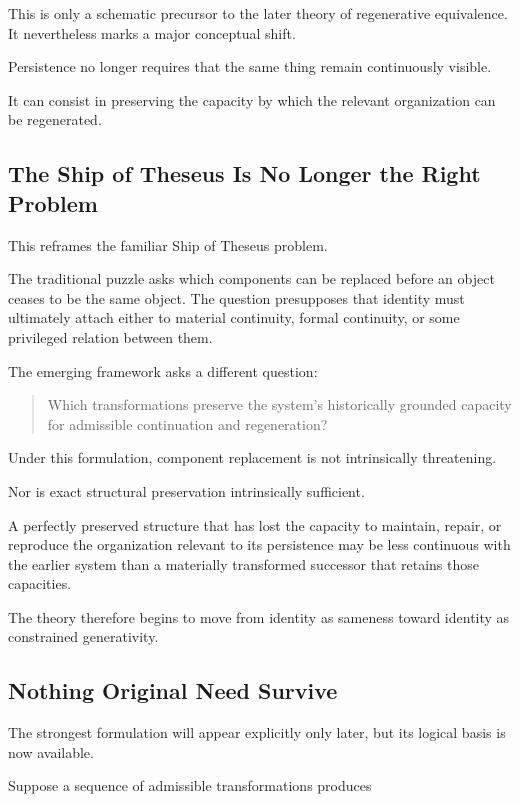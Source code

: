\documentclass[11pt]{article}
\theoremstyle{remark}
\begin{document}
This is only a schematic precursor to the later theory of regenerative equivalence. It nevertheless marks a major conceptual shift.

Persistence no longer requires that the same thing remain continuously visible.

It can consist in preserving the capacity by which the relevant organization can be regenerated.

\subsection{The Ship of Theseus Is No Longer the Right Problem}

This reframes the familiar Ship of Theseus problem.

The traditional puzzle asks which components can be replaced before an object ceases to be the same object. The question presupposes that identity must ultimately attach either to material continuity, formal continuity, or some privileged relation between them.

The emerging framework asks a different question:

\begin{quote}
Which transformations preserve the system's historically grounded capacity for admissible continuation and regeneration?
\end{quote}

Under this formulation, component replacement is not intrinsically threatening.

Nor is exact structural preservation intrinsically sufficient.

A perfectly preserved structure that has lost the capacity to maintain, repair, or reproduce the organization relevant to its persistence may be less continuous with the earlier system than a materially transformed successor that retains those capacities.

The theory therefore begins to move from identity as sameness toward identity as constrained generativity.

\subsection{Nothing Original Need Survive}

The strongest formulation will appear explicitly only later, but its logical basis is now available.

Suppose a sequence of admissible transformations produces
\end{document}
